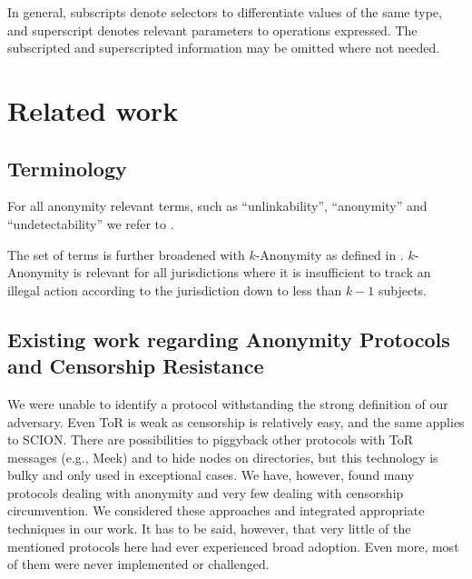 \documentclass[acmsmall, screen, review]{acmart}
\begin{document}
In general, subscripts denote selectors to differentiate values of the same type, and superscript denotes relevant parameters to operations expressed. The subscripted and superscripted information may be omitted where not needed.

\section{Related work}
\subsection{Terminology}
For all anonymity relevant terms, such as ``unlinkability'', ``anonymity'' and ``undetectability'' we refer to \cite{anonTerminology}.

The set of terms is further broadened with $k$-Anonymity as defined in \cite{k-anonymous:ccs2003}. $k$-Anonymity is relevant for all jurisdictions where it is insufficient to track an illegal action according to the jurisdiction down to less than $k-1$ subjects.

\subsection{Existing work regarding Anonymity Protocols and Censorship Resistance}
We were unable to identify a protocol withstanding the strong definition of our adversary. Even ToR is weak as censorship is relatively easy, and the same applies to SCION. There are possibilities to piggyback other protocols with ToR messages (e.g., Meek) and to hide nodes on directories, but this technology is bulky and only used in exceptional cases. We have, however, found many protocols dealing with anonymity and very few dealing with censorship circumvention. We considered these approaches and integrated appropriate techniques in our work. It has to be said, however, that very little of the mentioned protocols here had ever experienced broad adoption. Even more, most of them were never implemented or challenged. 
\end{document}
